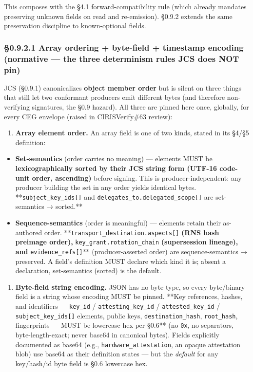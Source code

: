 \documentclass[10pt]{article}
\begin{document}
This composes with the §4.1 forward-compatibility rule (which already mandates preserving unknown fields on read and re-emission). §0.9.2 extends the same preservation discipline to known-optional fields.


\subsubsection*{§0.9.2.1 Array ordering + byte-field + timestamp encoding (normative — the three determinism rules JCS does NOT pin)}


JCS (§0.9.1) canonicalizes \textbf{object member order} but is silent on three things that still let two conformant producers emit different bytes (and therefore non-verifying signatures, the §0.9 hazard). All three are pinned here once, globally, for every CEG envelope (raised in CIRISVerify\#63 review):


\begin{enumerate}\setlength\itemsep{0pt}
\item \textbf{Array element order.} An array field is one of two kinds, stated in its §4/§5 definition:
\end{enumerate}

\begin{itemize}\setlength\itemsep{0pt}
\item \textbf{Set-semantics} (order carries no meaning) — elements MUST be \textbf{lexicographically sorted by their JCS string form (UTF-16 code-unit order, ascending)} before signing. This is producer-independent: any producer building the set in any order yields identical bytes. **\texttt{subject\_key\_ids[]} and \texttt{delegates\_to.delegated\_scope[]} are set-semantics → sorted.**
\item \textbf{Sequence-semantics} (order is meaningful) — elements retain their as-authored order. **\texttt{transport\_destination.aspects[]}\textbf{ (RNS hash preimage order), }\texttt{key\_grant.rotation\_chain}\textbf{ (supersession lineage), and }\texttt{evidence\_refs[]}** (producer-asserted order) are sequence-semantics → preserved. A field's definition MUST declare which kind it is; absent a declaration, set-semantics (sorted) is the default.
\end{itemize}

\begin{enumerate}\setlength\itemsep{0pt}
\item \textbf{Byte-field string encoding.} JSON has no byte type, so every byte/binary field is a string whose encoding MUST be pinned. **Key references, hashes, and identifiers — \texttt{key\_id} / \texttt{attesting\_key\_id} / \texttt{attested\_key\_id} / \texttt{subject\_key\_ids[]} elements, public keys, \texttt{destination\_hash}, \texttt{root\_hash}, fingerprints — MUST be lowercase hex per §0.6** (no \texttt{0x}, no separators, byte-length-exact; never base64 in canonical bytes). Fields explicitly documented as base64 (e.g., \texttt{hardware\_attestation}, an opaque attestation blob) use base64 as their definition states — but the \textit{default} for any key/hash/id byte field is §0.6 lowercase hex.
\end{enumerate}
\end{document}
